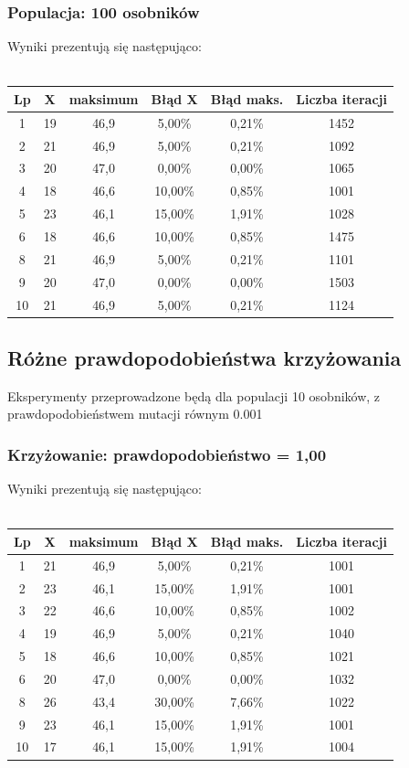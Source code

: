 \documentclass[a4paper,11pt]{article}
\begin{document}
			\subsubsection{Populacja: 100 osobników}
				Wyniki prezentują się następująco:\\~\\
				\begin{tabular}{|c|c|c|c|c|c|}
					\hline 
					Lp & X & maksimum & Błąd X & Błąd maks. & Liczba iteracji\\
					\hline
					1 & 19 & 46,9 & 5,00\% & 0,21\% & 1452\\\hline
					2 & 21  & 46,9 & 5,00\% & 0,21\% & 1092 \\\hline
					3 & 20 & 47,0 & 0,00\% & 0,00\% & 1065\\\hline
					4 & 18 & 46,6 & 10,00\% & 0,85\% & 1001 \\\hline
					5 & 23 & 46,1 & 15,00\% & 1,91\% & 1028 \\\hline
					6 & 18 & 46,6 & 10,00\% & 0,85\% & 1475\\\hline
					8 & 21 & 46,9 & 5,00\% & 0,21\% & 1101\\\hline
					9 & 20 & 47,0 & 0,00\% & 0,00\% & 1503\\\hline
					10 & 21 & 46,9 & 5,00\% & 0,21\% & 1124\\\hline
				\end{tabular} 
			\subsection{Różne prawdopodobieństwa krzyżowania}
				Eksperymenty przeprowadzone będą dla populacji 10 osobników, z prawdopodobieństwem mutacji równym 0.001
				\subsubsection{Krzyżowanie: prawdopodobieństwo = 1,00}
					Wyniki prezentują się następująco:\\~\\
					\begin{tabular}{|c|c|c|c|c|c|}
						\hline 
						Lp & X & maksimum & Błąd X & Błąd maks. & Liczba iteracji\\\hline
						1 & 21 & 46,9 & 5,00\% &0,21\%  &1001\\\hline
						2 & 23 & 46,1 & 15,00\% & 1,91\% &1001 \\\hline
						3 & 22 & 46,6 & 10,00\% &0,85\% &1002 \\\hline
						4 & 19 & 46,9 & 5,00\% & 0,21\%&1040 \\\hline
						5 & 18 & 46,6 & 10,00\% & 0,85\%&1021 \\\hline
						6 & 20 & 47,0 & 0,00\% & 0,00\%& 1032 \\\hline
						8 & 26 & 43,4 & 30,00\% & 7,66\%& 1022 \\\hline
						9 & 23 & 46,1 & 15,00\% & 1,91\%& 1001 \\\hline
						10 & 17 & 46,1&15,00\%  & 1,91\%& 1004 \\\hline
					\end{tabular} 
\end{document}
